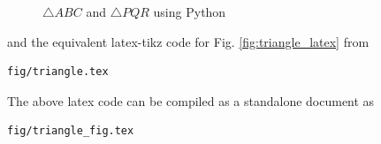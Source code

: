 \begin{enumerate}[label=\thesection.\arabic*.,ref=\thesection.\theenumi]
\begin{figure}[!ht]
\caption{$\triangle ABC$ and $\triangle PQR$ using Python}
\label{fig:triangle_python}
\end{figure}
%
and the equivalent latex-tikz code for Fig. \ref{fig:triangle_latex} from
\begin{lstlisting}
fig/triangle.tex
\end{lstlisting}
%
The above latex code can be compiled as a standalone document as
\begin{lstlisting}
fig/triangle_fig.tex
\end{lstlisting}



\end{enumerate}
